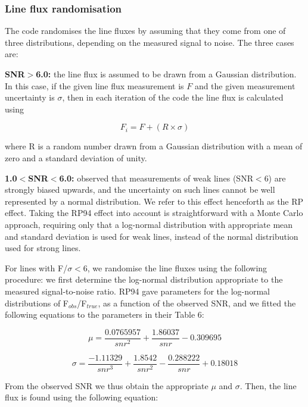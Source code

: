 \documentclass[useAMS,usenatbib]{mn2e}
\begin{document}
\subsubsection{Line flux randomisation}
\label{randomising}

The code randomises the line fluxes by assuming that they come from one of three distributions, depending on the measured signal to noise.  The three cases are:

{\bf SNR$>$6.0: } the line flux is assumed to be drawn from a Gaussian distribution.  In this case, if the given line flux measurement is $F$ and the given measurement uncertainty is $\sigma$, then in each iteration of the code the line flux is calculated using

\begin{equation}
F_i = F + (R\times\sigma)
\end{equation}

where R is a random number drawn from a Gaussian distribution with a mean of zero and a standard deviation of unity.

{\bf 1.0$<$SNR$<$6.0: } \citet[][hereafter RP94]{1994A&A...287..676R} observed that measurements of weak lines (SNR$<$6) are strongly biased upwards, and the uncertainty on such lines cannot be well represented by a normal distribution.  We refer to this effect henceforth as the RP effect.  Taking the RP94 effect into account is straightforward with a Monte Carlo approach, requiring only that a log-normal distribution with appropriate mean and standard deviation is used for weak lines, instead of the normal distribution used for strong lines.

For lines with F/$\sigma<$6, we randomise the line fluxes using the following procedure: we first determine the log-normal distribution appropriate to the measured signal-to-noise ratio.  RP94 gave parameters for the log-normal distributions of F$_{obs}$/F$_{true}$, as a function of the observed SNR, and we fitted the following equations to the parameters in their Table 6:

\begin{equation}
\mu = \frac{0.0765957}{snr^2} + \frac{1.86037}{snr} - 0.309695
\end{equation}

\begin{equation}
\sigma = \frac{-1.11329}{snr^3} + \frac{1.8542}{snr^2} - \frac{0.288222}{snr} + 0.18018
\end{equation}

From the observed SNR we thus obtain the appropriate $\mu$ and $\sigma$.  Then, the line flux is found using the following equation:
\end{document}
